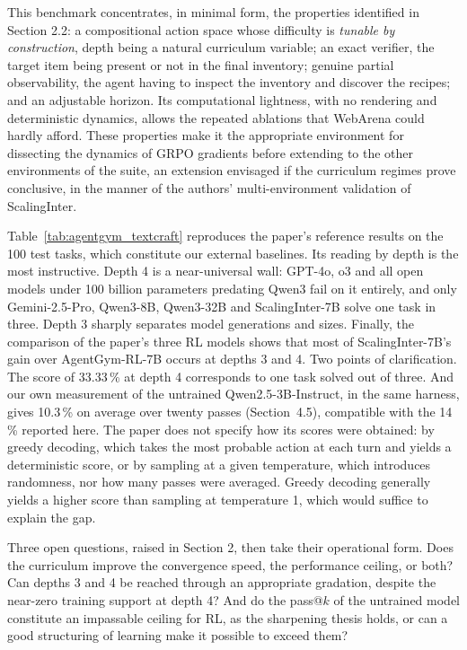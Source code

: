 \documentclass[11pt,a4paper]{article}
\begin{document}
This benchmark concentrates, in minimal form, the properties identified in Section 2.2: a compositional action space whose difficulty is \emph{tunable by construction}, depth being a natural curriculum variable; an exact verifier, the target item being present or not in the final inventory; genuine partial observability, the agent having to inspect the inventory and discover the recipes; and an adjustable horizon. Its computational lightness, with no rendering and deterministic dynamics, allows the repeated ablations that WebArena could hardly afford. These properties make it the appropriate environment for dissecting the dynamics of GRPO gradients before extending to the other environments of the suite, an extension envisaged if the curriculum regimes prove conclusive, in the manner of the authors' multi-environment validation of ScalingInter.

Table~\ref{tab:agentgym_textcraft} reproduces the paper's reference results on the 100 test tasks, which constitute our external baselines. Its reading by depth is the most instructive. Depth 4 is a near-universal wall: GPT-4o, o3 and all open models under 100 billion parameters predating Qwen3 fail on it entirely, and only Gemini-2.5-Pro, Qwen3-8B, Qwen3-32B and ScalingInter-7B solve one task in three. Depth 3 sharply separates model generations and sizes. Finally, the comparison of the paper's three RL models shows that most of ScalingInter-7B's gain over AgentGym-RL-7B occurs at depths 3 and 4. Two points of clarification. The score of 33.33\,\% at depth 4 corresponds to one task solved out of three. And our own measurement of the untrained Qwen2.5-3B-Instruct, in the same harness, gives 10.3\,\% on average over twenty passes (Section~4.5), compatible with the 14\,\% reported here. The paper does not specify how its scores were obtained: by greedy decoding, which takes the most probable action at each turn and yields a deterministic score, or by sampling at a given temperature, which introduces randomness, nor how many passes were averaged. Greedy decoding generally yields a higher score than sampling at temperature 1, which would suffice to explain the gap.



Three open questions, raised in Section 2, then take their operational form. Does the curriculum improve the convergence speed, the performance ceiling, or both? Can depths 3 and 4 be reached through an appropriate gradation, despite the near-zero training support at depth 4? And do the pass@$k$ of the untrained model constitute an impassable ceiling for RL, as the sharpening thesis holds, or can a good structuring of learning make it possible to exceed them?
\end{document}
